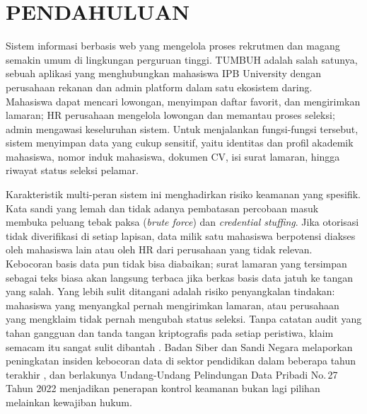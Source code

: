 \documentclass[12pt,a4paper]{article}
\begin{document}
\section{PENDAHULUAN}

Sistem informasi berbasis web yang mengelola proses rekrutmen dan
magang semakin umum di lingkungan perguruan tinggi. TUMBUH adalah
salah satunya, sebuah aplikasi yang menghubungkan mahasiswa IPB
University dengan perusahaan rekanan dan admin platform dalam satu
ekosistem daring. Mahasiswa dapat mencari lowongan, menyimpan daftar
favorit, dan mengirimkan lamaran; HR perusahaan mengelola lowongan dan
memantau proses seleksi; admin mengawasi keseluruhan sistem. Untuk
menjalankan fungsi-fungsi tersebut, sistem menyimpan data yang cukup
sensitif, yaitu identitas dan profil akademik mahasiswa, nomor induk
mahasiswa, dokumen CV, isi surat lamaran, hingga riwayat status seleksi
pelamar.

Karakteristik multi-peran sistem ini menghadirkan risiko keamanan yang
spesifik. Kata sandi yang lemah dan tidak adanya pembatasan percobaan
masuk membuka peluang tebak paksa (\textit{brute force}) dan
\textit{credential stuffing}. Jika otorisasi tidak diverifikasi di
setiap lapisan, data milik satu mahasiswa berpotensi diakses oleh
mahasiswa lain atau oleh HR dari perusahaan yang tidak relevan.
Kebocoran basis data pun tidak bisa diabaikan; surat lamaran yang
tersimpan sebagai teks biasa akan langsung terbaca jika berkas basis
data jatuh ke tangan yang salah. Yang lebih sulit ditangani adalah
risiko penyangkalan tindakan: mahasiswa yang menyangkal pernah
mengirimkan lamaran, atau perusahaan yang mengklaim tidak pernah
mengubah status seleksi. Tanpa catatan audit yang tahan gangguan dan
tanda tangan kriptografis pada setiap peristiwa, klaim semacam itu
sangat sulit dibantah \citep{Anderson2020}. Badan Siber dan Sandi
Negara melaporkan peningkatan insiden kebocoran data di sektor
pendidikan dalam beberapa tahun terakhir \citep{BSSN2023}, dan
berlakunya Undang-Undang Pelindungan Data Pribadi No.\,27 Tahun 2022
\citep{UUPDP2022} menjadikan penerapan kontrol keamanan bukan lagi
pilihan melainkan kewajiban hukum.
\end{document}
